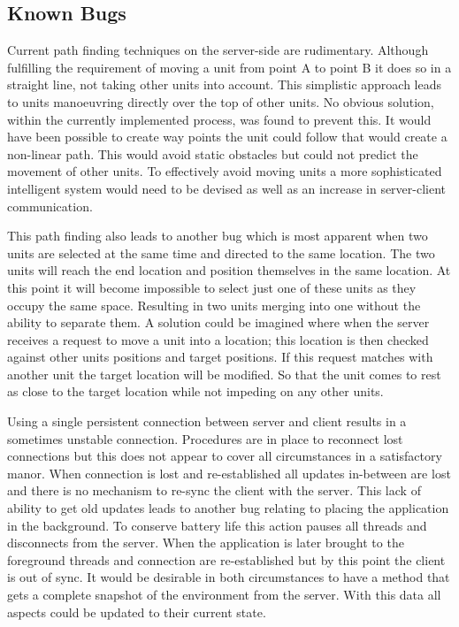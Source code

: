 \subsection{Known Bugs}
Current path finding techniques on the server-side are rudimentary. Although fulfilling the requirement of moving a unit from point A to point B it does so in a straight line, not taking other units into account. This simplistic approach leads to units manoeuvring directly over the top of other units. No obvious solution, within the currently implemented process, was found to prevent this. It would have been possible to create way points the unit could follow that would create a non-linear path. This would avoid static obstacles but could not predict the movement of other units. To effectively avoid moving units a more sophisticated intelligent system would need to be devised as well as an increase in server-client communication.

This path finding also leads to another bug which is most apparent when two units are selected at the same time and directed to the same location. The two units will reach the end location and position themselves in the same location. At this point it will become impossible to select just one of these units as they occupy the same space. Resulting in two units merging into one without the ability to separate them. A solution could be imagined where when the server receives a request to move a unit into a location; this location is then checked against other units positions and target positions. If this request matches with another unit the target location will be modified. So that the unit comes to rest as close to the target location while not impeding on any other units.

Using a single persistent connection between server and client results in a sometimes unstable connection. Procedures are in place to reconnect lost connections but this does not appear to cover all circumstances in a satisfactory manor. When connection is lost and re-established all updates in-between are lost and there is no mechanism to re-sync the client with the server. This lack of ability to get old updates leads to another bug relating to placing the application in the background. To conserve battery life this action pauses all threads and disconnects from the server. When the application is later brought to the foreground threads and connection are re-established but by this point the client is out of sync. It would be desirable in both circumstances to have a method that gets a complete snapshot of the environment from the server. With this data all aspects could be updated to their current state.

